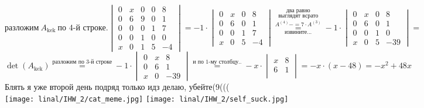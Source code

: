 \documentclass[17pt]{article}
\begin{document}
$$
\text{разложим}\ A_\text{kek}\ \text{по 4-й строке}.
\begin{vmatrix}
   0 & x & 0 & 0 & 8\\
   0 & 6 & 9 & 0 & 1\\
   0 & 0 & 0 & 1 & 7\\
   0 & 0 & 1 & 0 & 0\\
   x & 0 & 1 & 5 & -4
\end{vmatrix}
= 
-1 \cdot 
\begin{vmatrix}
   0 & x & 0 & 8\\
   0 & 6 & 0 & 1\\
   0 & 0 & 1 & 7\\
   x & 0 & 5 & -4
\end{vmatrix}
\underset{
    \text{извините...}
}{
    \overset{
        \text{два равно}
    }{
        \overset{
            \text{выглядят всрато}
        }{
            \overset{
                A^{(4)}-=7\cdot A^{(3)}
            }{
                =
            }
        }
    }
}
-1\cdot
\begin{vmatrix}
   0 & x & 0 & 8\\
   0 & 6 & 0 & 1\\
   0 & 0 & 1 & 0\\
   x & 0 & 5 & -39
\end{vmatrix} =
$$
$$
\det(A_\text{kek}) \overset{\text{разложим по 3-й строке}}{=}
-1\cdot
\begin{vmatrix}
   0 & x & 8\\
   0 & 6 & 1\\
   x & 0 & -39
\end{vmatrix}
\overset{\text{и по 1-му столбцу..}}{=}
-x\cdot
\begin{vmatrix}
    x & 8\\
    6 & 1\\
\end{vmatrix}
= -x\cdot (x-48) = -x^2+48x
$$
Блять я уже второй день подряд только идз делаю, убейте(9(((
\\
\texttt{[image: linal/IHW\_2/cat\_meme.jpg]}
\texttt{[image: linal/IHW\_2/self\_suck.jpg]}
\\
\end{document}
